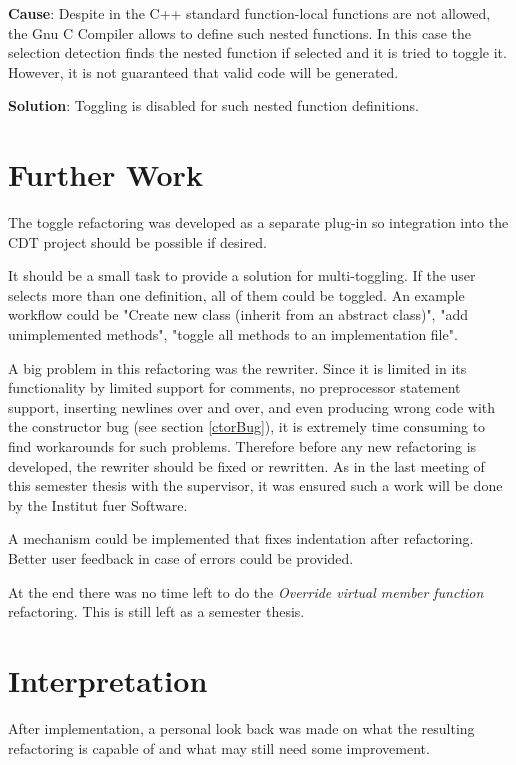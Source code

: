 \textbf{Cause}: Despite in the C++ standard\cite{IsoCpp} function-local 
functions are not allowed, the Gnu C Compiler allows to define such nested 
functions\cite{GCC}. In this case the selection detection finds the nested 
function if selected and it is tried to toggle it. However, it is not guaranteed 
that valid code will be generated.

\textbf{Solution}: Toggling is disabled for such nested function definitions.

\section{Further Work}

The toggle refactoring was developed as a separate plug-in so integration into 
the CDT project should be possible if desired.

It should be a small task to provide a solution for multi-toggling. If the user 
selects more than one definition, all of them could be toggled. An example 
workflow could be "Create new class (inherit from an abstract class)", "add 
unimplemented methods", "toggle all methods to an implementation file".

A big problem in this refactoring was the rewriter. Since it is limited in its
functionality by limited support for comments, no preprocessor statement
support, inserting newlines over and over, and even producing wrong code with
the constructor bug (see section \ref{ctorBug}), it is
extremely time consuming to find workarounds for such problems.
Therefore before any new refactoring is developed, the rewriter should be
fixed or rewritten.
As in the last meeting of this semester thesis with the supervisor, it was
ensured such a work will be done by the Institut fuer Software.

A mechanism could be implemented that fixes indentation after refactoring.
Better user feedback in case of errors could be provided.

At the end there was no time left to do the \textit{Override virtual member
function} refactoring. This is still left as a semester thesis.

\section{Interpretation}
\thispagestyle{fancy}

After implementation, a personal look back was made on what the resulting
refactoring is capable of and what may still need some improvement.

